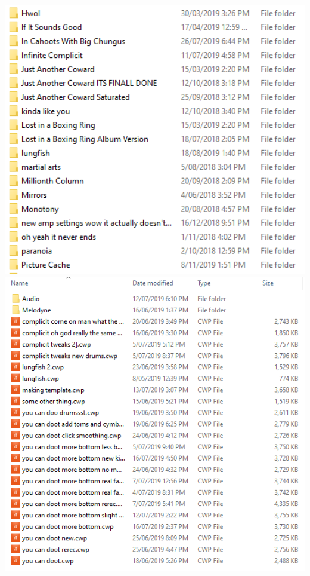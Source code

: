 \documentclass[unknownkeysallowed,usepdftitle=false, parskip=full]{beamer}
\begin{document}
\begin{frame}
\begin{columns}
    \begin{column}{0.5\textwidth}
    \includegraphics[width=1\textwidth,height=0.45\textheight,keepaspectratio]{figure/clutter-folder.png}
    \vspace{4pt}
    \includegraphics[width=1\textwidth,height=0.45\textheight,keepaspectratio]{figure/clutter-project.png}
    \end{column}
\end{columns}

   
\end{frame}
\end{document}
